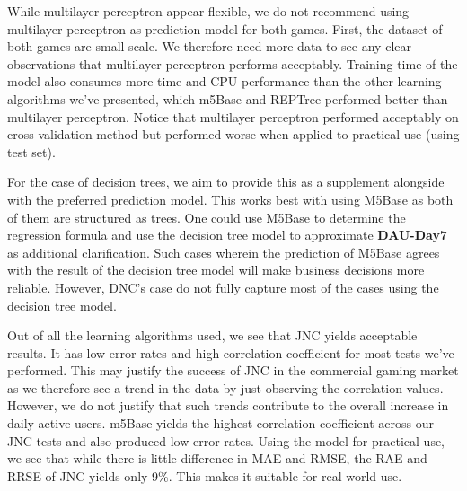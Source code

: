 While multilayer perceptron appear flexible, we do not recommend using multilayer perceptron as prediction model for both games. First, the dataset of both games are small-scale. We therefore need more data to see any clear observations that multilayer perceptron performs acceptably. Training time of the model also consumes more time and CPU performance than the other learning algorithms we've presented, which m5Base and REPTree performed better than multilayer perceptron. Notice that multilayer perceptron performed acceptably on cross-validation method but performed worse when applied to practical use (using test set).

For the case of decision trees, we aim to provide this as a supplement alongside with the preferred prediction model. This works best with using M5Base as both of them are structured as trees. One could use M5Base to determine the regression formula and use the decision tree model to approximate \textbf{DAU-Day7} as additional clarification. Such cases wherein the prediction of M5Base agrees with the result of the decision tree model will make business decisions more reliable. However, DNC's case do not fully capture most of the cases using the decision tree model.

Out of all the learning algorithms used, we see that JNC yields acceptable results. It has low error rates and high correlation coefficient for most tests we've performed. This may justify the success of JNC in the commercial gaming market as we therefore see a trend in the data by just observing the correlation values. However, we do not justify that such trends contribute to the overall increase in daily active users. m5Base yields the highest correlation coefficient across our JNC tests and also produced low error rates. Using the model for practical use, we see that while there is little difference in MAE and RMSE, the RAE and RRSE of JNC yields only 9\%. This makes it suitable for real world use.